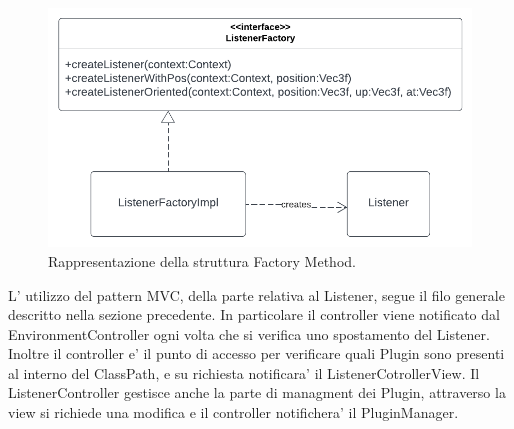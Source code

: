 \documentclass[a4paper,12pt]{report}
\begin{document}
\begin{figure}[H]
\centering{}
\includegraphics[width=\textwidth]{img/listener/ListenerFactory.png}
\caption{Rappresentazione della struttura Factory Method.}
\label{img:Listener}
\end{figure}
%
L' utilizzo del pattern MVC, della parte relativa al Listener, segue il filo generale descritto nella sezione precedente. In particolare il controller viene notificato
dal EnvironmentController ogni volta che si verifica uno spostamento del Listener. Inoltre il controller e' il punto di accesso per verificare quali Plugin sono presenti al interno del ClassPath, e su richiesta notificara' il  ListenerCotrollerView. Il ListenerController gestisce anche la parte di managment dei Plugin, attraverso la view si richiede una modifica e il controller notifichera' il PluginManager.
\end{document}
